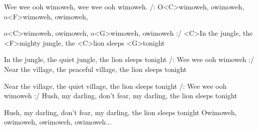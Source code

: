 
\zs
Wee wee ooh wimoweh,
wee wee ooh wimoweh.
\ks
\zr
/: O<C>wimoweh, owimoweh, o<F>wimoweh, owimoweh,

o<C>wimoweh, owimoweh, o<G>wimoweh, owimoweh :/
\kr
\zs
<C>In the jungle, the <F>mighty jungle, the <C>lion sleeps <G>tonight

In the jungle, the quiet jungle, the lion sleeps tonight
\ks
\zr
/: Wee wee ooh wimoweh :/
\kr
\zs
Near the village, the peaceful village, the lion sleeps tonight

Near the village, the quiet village, the lion sleeps tonight
\ks
\zr
/: Wee wee ooh wimoweh :/
\kr
\zs
Hush, my darling, don’t fear, my darling, the lion sleeps tonight

Hush, my darling, don’t fear, my darling, the lion sleeps tonight
\ks
\zr
Owimoweh, owimoweh, owimoweh, owimoweh...
\kr
\kp
